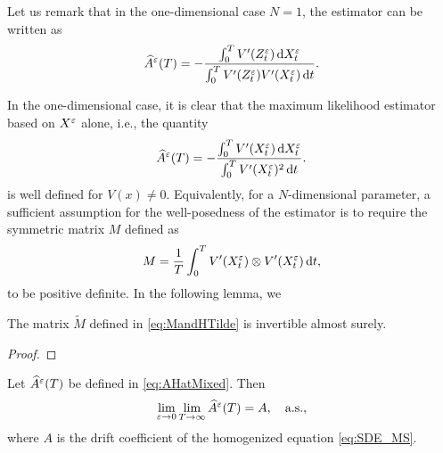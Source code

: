 \documentclass[10pt]{article}
\begin{document}
\begin{remark} Let us remark that in the one-dimensional case $N = 1$, the estimator can be written as
\begin{equation}
\widehat A^\varepsilon(T) = - \frac{\int_0^T V'(Z^\varepsilon_t) \,\mathrm{d} X^\varepsilon_t}{\int_0^T V'(Z^\varepsilon_t) V'(X^\varepsilon_t) \,\mathrm{d} t}.
\end{equation}
\end{remark}

In the one-dimensional case, it is clear that the maximum likelihood estimator based on $X^\varepsilon$ alone, i.e., the quantity
\begin{equation}
	\widehat A^\varepsilon(T) = - \frac{\int_0^T V'(X^\varepsilon_t) \,\mathrm{d} X^\varepsilon_t}{\int_0^T V'(X^\varepsilon_t)^2 \,\mathrm{d} t}.
\end{equation}
is well defined for $V(x) \neq 0$. Equivalently, for a $N$-dimensional parameter, a sufficient assumption for the well-posedness of the estimator is to require the symmetric matrix $M$ defined as
\begin{equation}
	M = \frac{1}{T} \int_0^T V'(X^\varepsilon_t) \otimes V'(X^\varepsilon_t) \,\mathrm{d} t,
\end{equation}
to be positive definite. In the following lemma, we 

\begin{lemma} The matrix $\widetilde M$ defined in \eqref{eq:MandHTilde} is invertible almost surely. \end{lemma}
\begin{proof}
	
\end{proof}

\begin{theorem}\label{thm:mainTheorem} Let $\widehat A^\varepsilon(T)$ be defined in \eqref{eq:AHatMixed}. Then
	\begin{equation}\label{eq:theoremFirst}
	\lim_{\varepsilon \to 0} \lim_{T \to \infty} \widehat A^\varepsilon(T) = A, \quad \text{a.s.},
	\end{equation}
	where $A$ is the drift coefficient of the homogenized equation \eqref{eq:SDE_MS}.
\end{theorem}
\end{document}
